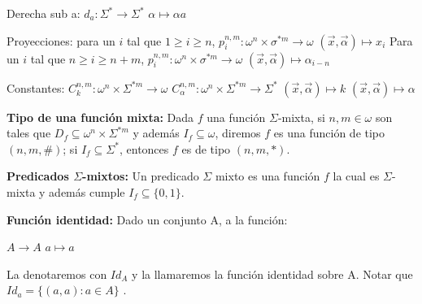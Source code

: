 \documentclass{article}
\begin{document}
\begin{flushleft}
Derecha sub a: $d_a: \Sigma^* \rightarrow \Sigma^*$\linebreak
\hspace*{21ex} $\alpha \mapsto \alpha a$\linebreak

Proyecciones: \linebreak
para un $i$ tal que $1 \geq i \geq n$,\linebreak
$p_i^{n, m}: \omega^n \times \sigma^{*m} \rightarrow \omega$\linebreak
\hspace*{8ex} $(\overrightarrow{x}, \overrightarrow{\alpha}) \mapsto x_i$\linebreak
Para un $i$ tal que $n \geq i \geq n+m$, \linebreak
$p_i^{n, m}: \omega^n \times \sigma^{*m} \rightarrow \omega$\linebreak
\hspace*{8ex} $(\overrightarrow{x}, \overrightarrow{\alpha}) \mapsto \alpha_{i-n}$\linebreak

Constantes: $C_k^{n, m}: \omega^n \times \Sigma^{*m} \rightarrow \omega$ \hspace*{13ex}$C_\alpha^{n, m}: \omega^n \times \Sigma^{*m} \rightarrow
\Sigma^*$\linebreak
\hspace*{22ex} $(\overrightarrow{x}, \overrightarrow{\alpha}) \mapsto k $ \hspace*{22ex} $(\overrightarrow{x}, \overrightarrow{\alpha}) \mapsto \alpha $\linebreak\linebreak

\textbf{Tipo de una función mixta:} Dada $f$ una función $\Sigma$-mixta, si $n, m \in \omega$ son tales que $D_f \subseteq \omega^n \times \Sigma^{*m}$ y además $I_f \subseteq \omega$, diremos $f$ es una función de tipo $(n, m, \#)$; si $I_f \subseteq \Sigma^*$, entonces $f$ es de tipo $(n, m, *)$. \linebreak

\textbf{Predicados $\Sigma$-mixtos:} Un predicado $\Sigma$ mixto es una función $f$ la cual es $\Sigma$-mixta y además cumple $I_f \subseteq \{0,1\}$.\linebreak

\textbf{Función identidad:} Dado un conjunto A, a la función:
\begin{center}
$A \rightarrow A$\linebreak
$a \mapsto a$
\end{center}
La denotaremos con $Id_A$ y la llamaremos la función identidad sobre A. Notar que $Id_a = \{(a, a): a \in A\}$ \linebreak.


\end{flushleft}
\end{document}
